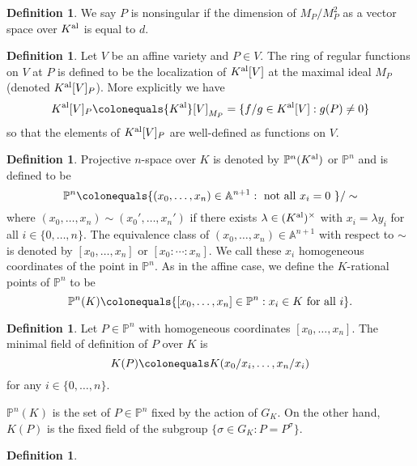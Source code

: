 \documentclass{dcthesis}
\newcommand{\PP}{\mathbb P}
\renewcommand{\AA}{\mathbb A}
\newcommand{\defi}[1]{\textsf{#1}}
\newcommand{\Kal}{{{K}^{\textup{al}}}}
\numberwithin{equation}{section}
\theoremstyle{definition}
\newtheorem{definition}[equation]{Definition}
\theoremstyle{remark}
\begin{document}
{{\begin{definition}
      We say $P$ is \defi{nonsingular}
      if the dimension of $M_P/M_P^2$ as
      a vector space over $\Kal$
      is equal to $d$.
    \end{definition}
    \begin{definition}
      \label{def:localringatP}
      Let $V$ be an affine variety
      and $P\in V$.
      The \defi{ring of regular functions on $V$ at $P$}
      is defined to be the localization
      of $\Kal[V]$ at the maximal ideal $M_P$
      (denoted $\Kal[V]_P$).
      More explicitly we have
      \[
        \Kal[V]_P
        \colonequals
        \Kal[V]_{M_P}
        =
        \{f/g\in\Kal[V]:g(P)\neq 0\}
      \]
      so that
      the elements of
      $\Kal[V]_P$
      are well-defined
      as functions on $V$.
    \end{definition}
    \begin{definition}
      \label{def:projectivespace}
      \defi{Projective $n$-space}
      over $K$ is denoted by $\PP^n(\Kal)$
      or $\PP^n$
      and is defined to be
      \[
        \PP^n\colonequals
        \{(x_0,\dots,x_{n})\in\AA^{n+1}:\text{ not all $x_i=0$ }\}/\sim
      \]
      where
      $(x_0,\dots,x_n)\sim(x_0',\dots,x_n')$
      if there exists $\lambda\in(\Kal)^\times$ with
      $x_i=\lambda y_i$ for all $i\in \{0,\dots,n\}$.
      The equivalence class of $(x_0,\dots,x_n)\in\AA^{n+1}$
      with respect to $\sim$ is denoted by
      $[x_0,\dots,x_n]$ or $[x_0:\cdots:x_n]$.
      We call these $x_i$
      \defi{homogeneous coordinates}
      of the point in $\PP^n$.
      As in the affine case,
      we define the
      \defi{$K$-rational points} of $\PP^n$
      to be
      \[
        \PP^n(K)\colonequals
        \{[x_0,\dots,x_n]\in\PP^n:x_i\in K \text{ for all } i\}.
      \]
    \end{definition}
    \begin{definition}
      \label{def:minimalfieldofdefinitionPPn}
      Let $P\in\PP^n$ with homogeneous coordinates
      $[x_0,\dots,x_n]$.
      The \defi{minimal field of definition of $P$ over $K$}
      is
      \[
        K(P)\colonequals
        K(x_0/x_i,\dots,x_n/x_i)
      \]
      for any $i\in \{0,\dots,n\}$.
    \end{definition}
    $\PP^n(K)$ is the set of $P\in\PP^n$
    fixed by the action of $G_K$.
    On the other hand,
    $K(P)$ is the fixed field of the
    subgroup
    $\{\sigma\in G_K: P = P^\sigma\}$.
    \begin{definition}
      \label{def:homogeneousideal}

\end{definition}}}
\end{document}
